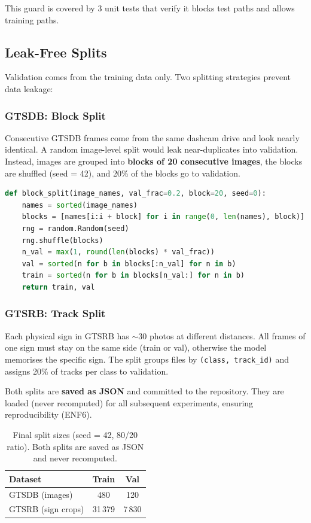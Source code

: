 \documentclass[12pt,a4paper]{article}
\begin{document}
This guard is covered by 3 unit tests that verify it blocks test paths and allows training paths.

\subsection{Leak-Free Splits}
\label{sec:splits}

Validation comes from the training data only. Two splitting strategies prevent data leakage:

\subsubsection{GTSDB: Block Split}

Consecutive GTSDB frames come from the same dashcam drive and look nearly identical. A random image-level split would leak near-duplicates into validation. Instead, images are grouped into \textbf{blocks of 20 consecutive images}, the blocks are shuffled (seed = 42), and 20\% of the blocks go to validation.

\begin{lstlisting}[language=Python, caption={Block split for GTSDB (simplified).}]
def block_split(image_names, val_frac=0.2, block=20, seed=0):
    names = sorted(image_names)
    blocks = [names[i:i + block] for i in range(0, len(names), block)]
    rng = random.Random(seed)
    rng.shuffle(blocks)
    n_val = max(1, round(len(blocks) * val_frac))
    val = sorted(n for b in blocks[:n_val] for n in b)
    train = sorted(n for b in blocks[n_val:] for n in b)
    return train, val
\end{lstlisting}

\subsubsection{GTSRB: Track Split}

Each physical sign in GTSRB has $\sim$30 photos at different distances. All frames of one sign must stay on the same side (train or val), otherwise the model memorises the specific sign. The split groups files by \texttt{(class, track\_id)} and assigns 20\% of tracks per class to validation.

\medskip
Both splits are \textbf{saved as JSON} and committed to the repository. They are loaded (never recomputed) for all subsequent experiments, ensuring reproducibility (ENF6).

\begin{table}[H]
\centering
\renewcommand{\arraystretch}{1.3}
\begin{tabular}{lcc}
\toprule
\textbf{Dataset} & \textbf{Train} & \textbf{Val} \\
\midrule
GTSDB (images)      & 480  & 120 \\
GTSRB (sign crops)  & 31\,379 & 7\,830 \\
\bottomrule
\end{tabular}
\caption{Final split sizes (seed = 42, 80/20 ratio). Both splits are saved as JSON and never recomputed.}
\label{tab:splits}
\end{table}
\end{document}
